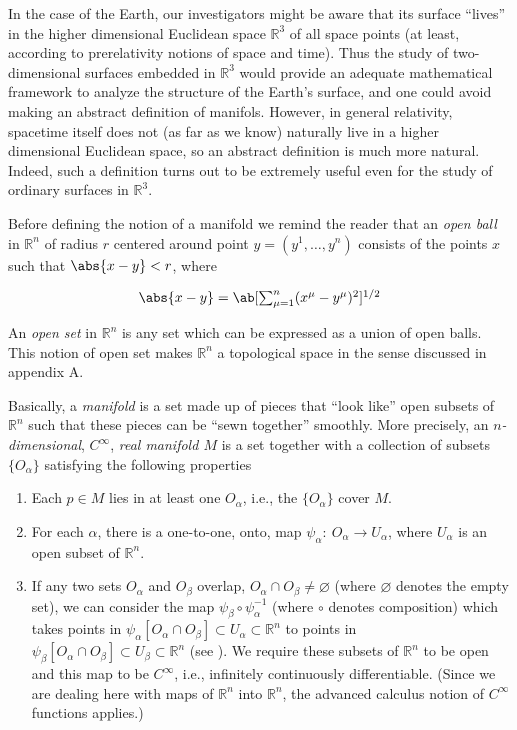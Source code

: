 In the case of the Earth, our investigators might be aware that its surface ``lives'' in the higher dimensional Euclidean space $\mathbb{R}^3$ of all space points (at least, according to prerelativity notions of space and time). Thus the study of two-dimensional surfaces embedded in  $\mathbb{R}^3$ would provide an adequate mathematical framework to analyze the structure of the Earth's surface, and one could avoid making an abstract definition of manifols. However, in general relativity, spacetime itself does not (as far as we know) naturally live in a higher dimensional Euclidean space, so an abstract definition is much more natural. Indeed, such a definition turns out to be extremely useful even for the study of ordinary surfaces in $\mathbb{R}^3$.

Before defining the notion of a manifold we remind the reader that an \emph{open ball} in $\mathbb{R}^n$ of radius $r$ centered around point $y=(y^1,\ldots,y^n)$ consists of the points $x$ such that $\abs{x-y}<r$, where

\[\textstyle\abs{x-y}=\ab[\sum_{\mu=1}^n(x^\mu-y^\mu)^2]^{1/2}\]

An \emph{open set} in $\mathbb{R}^n$ is any set which can be expressed as a union of open balls. This notion of open set makes $\mathbb{R}^n$ a topological space in the sense discussed in appendix A.

Basically, a \emph{manifold} is a set made up of pieces that ``look like'' open subsets of $\mathbb{R}^n$ such that these pieces can be ``sewn together'' smoothly. More precisely, an \emph{$n$-dimensional}, $C^\infty$, \emph{real manifold $M$} is a set together with a collection of subsets $\{O_\alpha\}$ satisfying the following properties
\begin{enumerate}[label=(\arabic*)]
    \item Each $p\in M$ lies in at least one $O_\alpha$, i.e., the $\{O_\alpha\}$ cover $M$.
    \item For each $\alpha$, there is a one-to-one, onto, map $\psi_\alpha:\ O_\alpha\to U_\alpha$, where $U_\alpha$ is an open subset of $\mathbb{R}^n$.
    \item If any two sets $O_\alpha$ and $O_\beta$ overlap, $O_\alpha\cap O_\beta\neq\varnothing$ (where $\varnothing$ denotes the empty set), we can consider the map $\psi_\beta\circ\psi_\alpha^{-1}$ (where $\circ$ denotes composition) which takes points in $\psi_\alpha[O_\alpha\cap O_\beta]\subset U_\alpha\subset\mathbb{R}^n$ to points in $\psi_\beta[O_\alpha\cap O_\beta]\subset U_\beta\subset\mathbb{R}^n$ (see ). We require these subsets of $\mathbb{R}^n$ to be open and this map to be $C^\infty$, i.e., infinitely continuously differentiable. (Since we are dealing here with maps of $\mathbb{R}^n$ into $\mathbb{R}^n$, the advanced calculus notion of $C^\infty$ functions applies.)
\end{enumerate}

